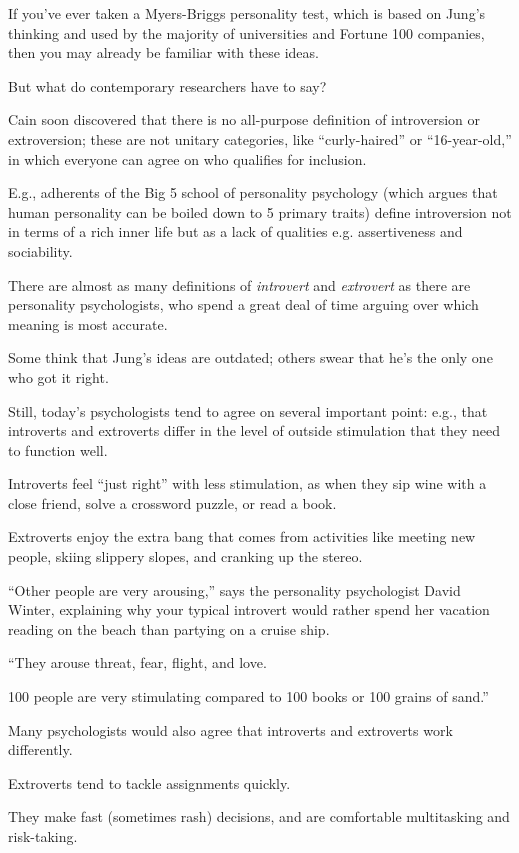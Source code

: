 \documentclass[oneside]{article}
\numberwithin{equation}{section}
\begin{document}
If you've ever taken a Myers-Briggs personality test, which is based on Jung's thinking and used by the majority of universities and Fortune 100 companies, then you may already be familiar with these ideas.

%
But what do contemporary researchers have to say?

Cain soon discovered that there is no all-purpose definition of introversion or extroversion; these are not unitary categories, like ``curly-haired'' or ``16-year-old,'' in which everyone can agree on who qualifies for inclusion.

E.g., adherents of the Big 5 school of personality psychology (which argues that human personality can be boiled down to 5 primary traits) define introversion not in terms of a rich inner life but as a lack of qualities e.g. assertiveness and sociability.

There are almost as many definitions of \textit{introvert} and \textit{extrovert} as there are personality psychologists, who spend a great deal of time arguing over which meaning is most accurate.

Some think that Jung's ideas are outdated; others swear that he's the only one who got it right.

%
Still, today's psychologists tend to agree on several important point: e.g., that introverts and extroverts differ in the level of outside stimulation that they need to function well.

Introverts feel ``just right'' with less stimulation, as when they sip wine with a close friend, solve a crossword puzzle, or read a book.

Extroverts enjoy the extra bang that comes from activities like meeting new people, skiing slippery slopes, and cranking up the stereo.

``Other people are very arousing,'' says the personality psychologist David Winter, explaining why your typical introvert would rather spend her vacation reading on the beach than partying on a cruise ship.

``They arouse threat, fear, flight, and love.

100 people are very stimulating compared to 100 books or 100 grains of sand.''

%
Many psychologists would also agree that introverts and extroverts work differently.

Extroverts tend to tackle assignments quickly.

They make fast (sometimes rash) decisions, and are comfortable multitasking and risk-taking.
\end{document}
